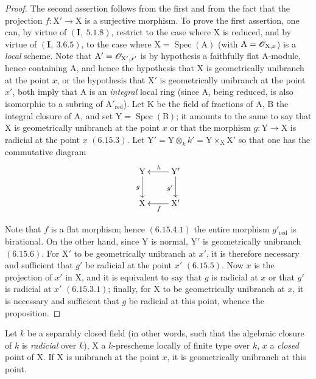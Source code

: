 \begin{proof}
The second assertion follows from the first and from the fact that the projection $f:\mathrm{X}'\to\mathrm{X}$
is a surjective morphism. To prove the first assertion, one can, by virtue of
$(\mathbf{I},~5.1.8)$, restrict to the case where $\mathrm{X}$ is reduced, and by virtue of $(\mathbf{I},~3.6.5)$, to the case
where $\mathrm{X}=\operatorname{Spec}(\mathrm{A})$ (with $\mathrm{A}=\mathscr{O}_{\mathrm{X},x}$) is a \emph{local} scheme. Note that $\mathrm{A}'=\mathscr{O}_{\mathrm{X}',x'}$ is
by hypothesis a faithfully flat $\mathrm{A}$-module, hence containing $\mathrm{A}$, and hence
the hypothesis that $\mathrm{X}$ is geometrically unibranch at the point $x$, or the hypothesis that $\mathrm{X}'$ is
geometrically unibranch at the point $x'$, both imply that $\mathrm{A}$ is an \emph{integral}
local ring (since $\mathrm{A}$, being reduced, is also isomorphic to a subring of $\mathrm{A}'_{\mathrm{red}}$).
Let $\mathrm{K}$ be the field of fractions of $\mathrm{A}$, $\mathrm{B}$ the integral closure of $\mathrm{A}$, and set $\mathrm{Y}=\operatorname{Spec}(\mathrm{B})$;
it amounts to the same to say that $\mathrm{X}$ is geometrically unibranch at the point $x$ or that
the morphism $g:\mathrm{Y}\to\mathrm{X}$ is radicial at the point $x$ $(6.15.3)$. Let $\mathrm{Y}'=\mathrm{Y}\otimes_k k'=\mathrm{Y}\times_\mathrm{X}\mathrm{X}'$
so that one has the commutative diagram
\[
\xymatrix{
  \mathrm{Y} \ar[d]_{g} & \mathrm{Y}' \ar[l]_{h} \ar[d]_{g'} \\
  \mathrm{X} & \mathrm{X}' \ar[l]^{f}
}
\]

Note that $f$ is a flat morphism; hence $(6.15.4.1)$ the entire morphism $g'_{\mathrm{red}}$ is
birational. On the other hand, since $\mathrm{Y}$ is normal, $\mathrm{Y}'$ is geometrically unibranch $(6.15.6)$.
For $\mathrm{X}'$ to be geometrically unibranch at $x'$, it is therefore necessary and sufficient that $g'$
be radicial at the point $x'$ $(6.15.5)$. Now $x$ is the projection of $x'$ in $\mathrm{X}$, and it is equivalent
to say that $g$ is radicial at $x$ or that $g'$ is radicial at $x'$ $(6.15.3.1)$; finally, for $\mathrm{X}$
to be geometrically unibranch at $x$, it is necessary and sufficient that $g$ be radicial at this point,
whence the proposition.
\end{proof}

\begin{lemma}[6.15.8]
\label{IV.6.15.8}
Let $k$ be a separably closed field \textup{(in other words, such that the
algebraic closure of $k$ is \emph{radicial} over $k$)}, $\mathrm{X}$ a $k$-prescheme locally of finite type over $k$,
$x$ a \emph{closed} point of $\mathrm{X}$. If $\mathrm{X}$ is unibranch at the point $x$, it is geometrically unibranch at this point.
\end{lemma}


